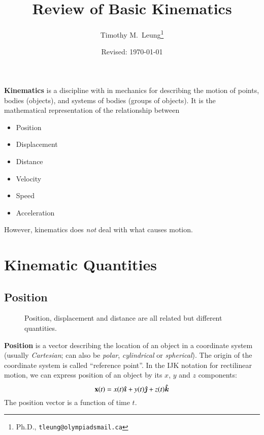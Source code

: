 \documentclass[11pt]{article}
\title{Review of Basic Kinematics}
\author{Timothy M.\ Leung\thanks{Ph.D., \texttt{tleung@olympiadsmail.ca}}}
\affil{Olympiads School\\Toronto, Ontario, Canada}
\date{Revised: \today}
\newcommand{\mb}[1]{\ensuremath\mathbf{#1}}
\begin{document}
\maketitle


\textbf{Kinematics} is a discipline with in mechanics for describing the
motion of points, bodies (objects), and systems of  bodies (groups of objects).
It is the mathematical representation of the relationship between
\begin{itemize}[noitemsep]
\item Position
\item Displacement
\item Distance 
\item Velocity
\item Speed
\item Acceleration
\end{itemize}
However, kinematics does \emph{not} deal with what causes motion.


\section{Kinematic Quantities}

\subsection{Position}

\begin{wrapfigure}{r}{.35\textwidth}
  \centering
  \caption{Position, displacement and distance are all related but different
    quantities.}
  \label{fig:d-vs-d}
\end{wrapfigure}
\textbf{Position} is a vector describing the location of an object in a
coordinate system (usually \emph{Cartesian}; can also be \emph{polar},
\emph{cylindrical} or \emph{spherical}). The origin of the coordinate system
is called ``reference point''.  In the IJK notation for rectilinear motion, we
can express position of an object by its $x$, $y$ and $z$ components:
\begin{equation*}
  \mb{x}(t)=x(t)\bm{\hat{\imath}} + y(t)\bm{\hat{\jmath}} + z(t)\bm{\hat{k}}
\end{equation*}
The position vector is a function of time $t$.
\end{document}

